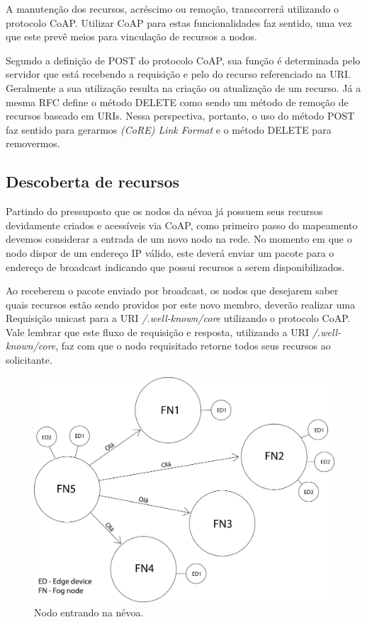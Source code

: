 A manutenção dos recursos, acréscimo ou remoção, transcorrerá utilizando o protocolo CoAP.
Utilizar CoAP para estas funcionalidades faz sentido, uma vez que este prevê meios para vinculação de recursos a nodos.

Segundo a definição de POST do protocolo CoAP, sua função é determinada pelo servidor que está recebendo a requisição e pelo do recurso referenciado na URI.
Geralmente a sua utilização resulta na criação ou atualização de um recurso\cite{rfc7252}.
Já a mesma RFC define o método DELETE como sendo um método de remoção de recursos baseado em URIs\cite{rfc7252}.
Nessa perspectiva, portanto, o uso do método POST faz sentido para gerarmos \textit{(CoRE) Link Format} e o método DELETE para removermos.


\subsection{Descoberta de recursos}


Partindo do pressuposto que os nodos da névoa já possuem seus recursos devidamente criados e acessíveis via CoAP,
como primeiro passo do mapeamento devemos considerar a entrada de um novo nodo na rede.
No momento em que o nodo dispor de um endereço IP válido, este deverá enviar um pacote para o endereço de broadcast indicando que possui recursos a serem disponibilizados.


Ao receberem o pacote enviado por broadcast, os nodos que desejarem saber quais recursos estão sendo providos por este novo membro, deverão realizar uma Requisição
unicast para a URI \textit{/.well-known/core} utilizando o protocolo CoAP.
Vale lembrar que este fluxo de requisição e resposta, utilizando a URI \textit{/.well-known/core}, faz com que o nodo requisitado retorne todos seus recursos ao solicitante.

\begin{figure}[H]
    \centering\includegraphics[width=.5\textwidth]{fig5.png}
    \caption%
    {\label{fig:fig5} Nodo entrando na névoa.}
\end{figure}


